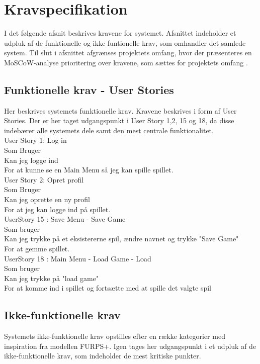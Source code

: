 \section{Kravspecifikation}
\label{sec:kravspec}

I det følgende afsnit beskrives kravene for systemet. Afsnittet indeholder et udpluk af de funktionelle og ikke funtionelle krav, som omhandler det samlede system.
Til slut i afsnittet afgrænses projektets omfang, hvor der præsenteres en MoSCoW-analyse prioritering over kravene, som sættes for projektets omfang \parencite[][Section 6.2]{TekniskBilag}.\\  


\subsection{Funktionelle krav - User Stories}
Her beskrives systemets funktionelle krav. Kravene beskrives i form af User Stories. Der er her taget udgangspunkt i User Story 1,2, 15 og 18, da disse indebærer alle systemets dele samt den mest centrale funktionalitet.\\  
 
User Story 1: Log in \\
  Som Bruger \\
  Kan jeg logge ind \\
  For at kunne se en Main Menu så jeg kan spille spillet. \\
  
User Story 2: Opret profil \\
  Som Bruger \\
  Kan jeg oprette en ny profil \\
  For at jeg kan logge ind på spillet. \\
  
UserStory 15 : Save Menu - Save Game\\
  Som bruger \\
  Kan jeg trykke på et eksistererne spil, ændre navnet og trykke "Save Game" \\
  For at gemme spillet.\\

UserStory 18 : Main Menu - Load Game - Load\\
  Som bruger \\
  Kan jeg trykke på "load game" \\
  For at komme ind i spillet og fortsætte med at spille det valgte spil\\


\subsection{Ikke-funktionelle krav}
Systemets ikke-funktionelle krav opstilles efter en række kategorier med inspiration fra modellen FURPS+. Igen tages her udgangspunkt i et udpluk af de ikke-funktionelle krav, som indeholder de mest kritiske punkter.\\

